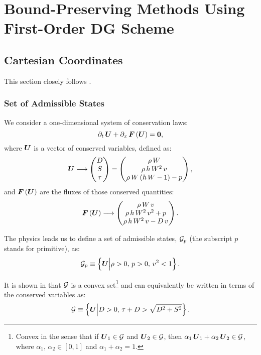 
\section{Bound-Preserving Methods Using First-Order DG Scheme}

\subsection{Cartesian Coordinates}
This section closely follows \citet{Qin2016}.

\subsubsection{Set of Admissible States}
We consider a one-dimensional system of conservation laws:
\begin{equation}
    \pd{\,\bU}{t} + \pd{\,\bF\left(\bU\right)}{x} = \vect{0},
\end{equation}
where $\bU$ is a vector of conserved variables, defined as:
\begin{equation}\label{Eq:ConservedVariables}
    \bU\longrightarrow\begin{pmatrix} D\\ S\\ \tau\end{pmatrix}=\begin{pmatrix} \rho\,W\\ \rho\,h\,W^{2}\,v\\ \rho\,W\left(h\,W-1\right)-p\end{pmatrix},
\end{equation}
and $\bF\left(\bU\right)$ are the fluxes of those conserved quantities:
\begin{equation}\label{Eq:FluxVector}
    \bF\left(\bU\right)\longrightarrow\begin{pmatrix}\rho\,W\,v\\ \rho\,h\,W^{2}\,v^{2}+p\\\rho\,h\,W^{2}\,v-D\,v\end{pmatrix}.
\end{equation}


The physics leads us to define a set of admissible states, $\cG_{p}$ (the subscript $p$ stands for primitive), as:
\begin{equation}
    \cG_{p}\equiv\left\{\bU\Big|\rho>0,\,p>0,\,v^{2}<1\right\}.
\end{equation}

It is shown in \citet{Mignone2005} that $\cG$ is a convex set\footnote{Convex in the sense that if $\bU_{1}\in\cG$ and $\bU_{2}\in\cG$, then $\alpha_{1}\,\bU_{1}+\alpha_{2}\,\bU_{2}\in\cG$, where $\alpha_{1},\,\alpha_{2}\in\left[0,1\right]$ and $\alpha_{1}+\alpha_{2}=1$.} and can equivalently be written in terms of the conserved variables as:
\begin{equation}\label{Eq:SetOfAdmissibleStates}
    \cG\equiv\left\{\bU\Big|D>0,\,\tau+D>\sqrt{D^{2}+S^{2}}\right\}.
\end{equation}

